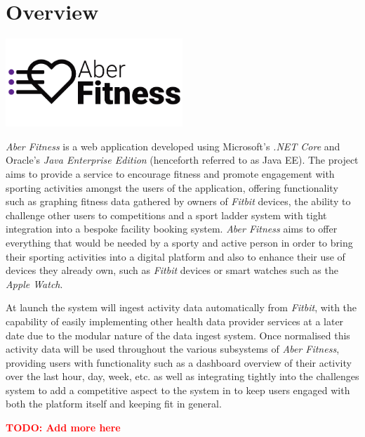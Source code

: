 \chapter{Overview}

\begin{center}
	\includegraphics[width=0.5\textwidth]{Images/aberfitness.png}
\end{center}

\textit{Aber Fitness} is a web application developed using Microsoft's \textit{.NET Core} and Oracle's \textit{Java Enterprise Edition} (henceforth referred to as Java EE). The project aims to provide a service to encourage fitness and promote engagement with sporting activities amongst the users of the application, offering functionality such as graphing fitness data gathered by owners of \textit{Fitbit} devices, the ability to challenge other users to competitions and a sport ladder system with tight integration into a bespoke facility booking system. \textit{Aber Fitness} aims to offer everything that would be needed by a sporty and active person in order to bring their sporting activities into a digital platform and also to enhance their use of devices they already own, such as \textit{Fitbit} devices or smart watches such as the \textit{Apple Watch}.

At launch the system will ingest activity data automatically from \textit{Fitbit}, with the capability of easily implementing other health data provider services at a later date due to the modular nature of the data ingest system. Once normalised this activity data will be used throughout the various subsystems of \textit{Aber Fitness}, providing users with functionality such as a dashboard overview of their activity over the last hour, day, week, etc. as well as integrating tightly into the challenges system to add a competitive aspect to the system in to keep users engaged with both the platform itself and keeping fit in general. 

\textcolor{red}{\textbf{TODO: Add more here}}